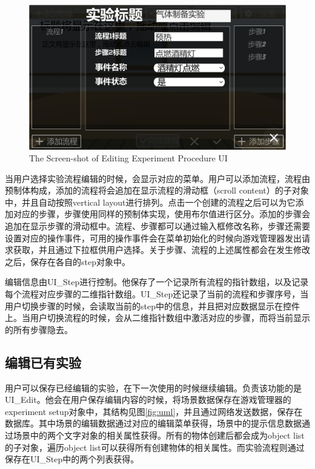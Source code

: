 \begin{figure}[!htp]
  \centering
  \includegraphics[width=12cm]{figure/step.png}
    {The Screen-shot of Editing Experiment Procedure UI}
 \label{fig:gm}
\end{figure}

当用户选择实验流程编辑的时候，会显示对应的菜单。用户可以添加流程，流程由预制体构成，添加的流程将会追加在显示流程的滑动框（scroll content）的子对象中，并且自动按照vertical layout进行排列。点击一个创建的流程之后可以为它添加对应的步骤，步骤使用同样的预制体实现，使用布尔值进行区分。添加的步骤会追加在显示步骤的滑动框中。流程、步骤都可以通过输入框修改名称，步骤还需要设置对应的操作事件，可用的操作事件会在菜单初始化的时候向游戏管理器发出请求获取，并且通过下拉框供用户选择。关于步骤、流程的上述属性都会在发生修改之后，保存在各自的step对象中。

编辑信息由UI\_Step进行控制。他保存了一个记录所有流程的指针数组，以及记录每个流程对应步骤的二维指针数组。UI\_Step还记录了当前的流程和步骤序号，当用户切换步骤的时候，会读取当前的step中的信息，并且把对应数据显示在控件上。当用户切换流程的时候，会从二维指针数组中激活对应的步骤，而将当前显示的所有步骤隐去。


\subsection{编辑已有实验}
用户可以保存已经编辑的实验，在下一次使用的时候继续编辑。负责该功能的是UI\_Edit。他会在用户保存编辑内容的时候，将场景数据保存在游戏管理器的experiment setup对象中，其结构见图\ref{fig:uml}，并且通过网络发送数据，保存在数据库。其中场景的编辑数据通过对应的编辑菜单获得，场景中的提示信息数据通过场景中的两个文字对象的相关属性获得。所有的物体创建后都会成为object list的子对象，遍历object list可以获得所有创建物体的相关属性。而实验流程则通过保存在UI\_Step中的两个列表获得。

